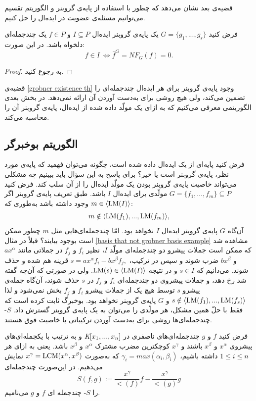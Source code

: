 قضیه‌ی بعد نشان می‌دهد که چطور با استفاده از پایه‌ی گروبنر و الگوریتم تقسیم می‌توانیم مسئله‌ی عضویت در ایده‌ال را حل کنیم.
\begin{theorem}
فرض کنید 
$G = \{g_{1},...,g_{s}\}$
یک پایه‌ی گروبنر ایده‌ال 
$I\subseteq P$
و 
$f\in P$
یک چندجمله‌ای دلخواه باشد. در این صورت:
$$f\in I \ \iff \bar{f}^{G} = NF_{G}(f) = 0.$$
\end{theorem}
\begin{proof}
به 
{\small \cite[ص.۸۴]{IVAcox}}
رجوع کنید.
\end{proof}

قضیه‌ی 
\ref{grobner existence th}
وجود پایه‌ی گروبنر برای هر ایده‌ال چندجمله‌ای را تضمین می‌کند، ولی هیچ روشی برای به‌دست  آوردن آن ارائه نمی‌دهد. در بخش بعدی الگوریتمی معرفی می‌کنیم که به ازای یک مولّد داده شده از ایده‌ال، پایه‌ی گروبنر آن را محاسبه می‌کند.

\subsection*{الگوریتم بوخبرگر}
فرض کنید پایه‌ای از یک ایده‌ال داده شده است، چگونه می‌توان فهمید که پایه‌ی مورد نظر، پایه‌ی گروبنر است یا خیر؟ برای پاسخ به این سؤال باید ببینیم چه مشکلی می‌تواند خاصیت پایه‌ی گروبنر بودن یک مولّد ایده‌ال را از آن سلب کند. فرض کنید 
$G = \{f_{1},...,f_{m}\}\subseteq P$
مولّدی برای ایده‌ال 
$I$
باشد. طبق تعریف پایه‌ی گروبنر اگر 
$m\in \langle\operatorname{\mathrm{LM}}(I)\rangle$
 وجود داشته باشد به‌طوری که:
 $$m\notin \langle\operatorname{\mathrm{LM}}(f_{1}),...,\operatorname{\mathrm{LM}}(f_{m})\rangle,$$
 آن‌گاه 
 $G$
 پایه‌ی گروبنر ایده‌ال 
 $I$
 نخواهد بود. امّا چند‌جمله‌ای‌هایی مثل 
 $m$
 چطور ممکن است بوجود بیایند؟ قبلاً در مثال 
 \ref{basis that not grobner basis example}
 مشاهده شد که ممکن است جملات پیشرو دو چند‌جمله‌ای مولّد  
 $I$،
 نظیر 
 $f_{i}$
 و
 $f_{j}$
 در جملاتی  مانند 
 $ax^{\alpha}$
 و
 $bx^{\beta}$
  ضرب شوند و سپس در ترکیب،
$s = ax^{\alpha}f_{i} - bx^{\beta}f_{j},$
قرینه هم شده و  حذف شوند. می‌دانیم که 
  $s\in I$
و در نتیجه 
$\operatorname{\mathrm{LM}}(s)\in \langle \operatorname{\mathrm{LM}}(I)\rangle$.
 ولی در صورتی که آن‌چه گفته شد رخ دهد، و جملات پیشروی دو چندجمله‌ای 
 $f_{i}$
 و
 $f_{j}$
 در
 $s$
 حذف شوند، آن‌گاه جمله‌ی پیشرو 
 $s$
 توسط هیچ یک از جملات پیشر‌و 
 $f_{i}$
 و
 $f_{j}$
 بخش نمی‌شود و لذا 
 $s\notin \langle \operatorname{\mathrm{LM}}(f_{1}),...,\operatorname{\mathrm{LM}}(f_{s})\rangle$
 و 
 $G$
 پایه‌ی گروبنر نخواهد بود. بوخبرگ ثابت کرده است که فقط با حلّ همین مشکل، هر مولّدی را می‌توان به یک پایه‌ی گروبنر گسترش داد. 
 $S$-
 چندجمله‌ای‌ها روشی برای به‌دست  آوردن ترکیباتی با خاصیت فوق هستند.
 
\begin{definition}
فرض کنید 
$f$
و
$g$
چندجمله‌ای‌های ناصفری در 
$\textit{K}[x_{1},...,x_{n}]$
و به ترتیب با یکجمله‌ای‌های پیشروی 
$x^{\alpha}$
و 
$x^{\beta}$
باشند و 
$x^{\gamma}$
کوچکترین مضرب مشترک 
$x^{\alpha}$
و
$x^{\beta}$
باشد. یعنی به ازای هر 
$1\leq i\leq n$
داشته باشیم، 
$\gamma_{i} = max(\alpha_{i}, \beta_{i})$
که به‌صورت 
$x^{\gamma} = \operatorname{\mathrm{LCM}}(x^{\alpha}, x^{\beta})$
نمایش می‌دهیم. در این‌صورت چندجمله‌ای 
$$S(f, g):= \frac{x^{\gamma}}{\lt(f)}f - \frac{x^{\gamma}}{\lt(g)}g$$
را 
$S$-
چندجمله ای 
$f$
و
$g$
می‌نامیم.
\end{definition}
 
